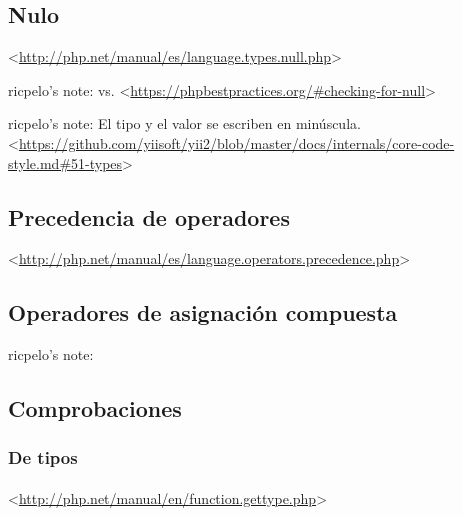 \documentclass[a4paper,11pt,spanish]{sphinxmanual}
\begin{document}
\subsection{Nulo}
\label{\detokenize{php:nulo}}
\textless{}\url{http://php.net/manual/es/language.types.null.php}\textgreater{}

\begin{DUlineblock}{0em}
\item[] ricpelo's note:  vs.
 \textless{}\url{https://phpbestpractices.org/\#checking-for-null}\textgreater{}
\item[] ricpelo's note: El tipo  y el valor  se escriben en
minúscula. \textless{}\url{https://github.com/yiisoft/yii2/blob/master/docs/internals/core-code-style.md\#51-types}\textgreater{}
\end{DUlineblock}


\subsection{Precedencia de operadores}
\label{\detokenize{php:precedencia-de-operadores}}
\textless{}\url{http://php.net/manual/es/language.operators.precedence.php}\textgreater{}


\subsection{Operadores de asignación compuesta}
\label{\detokenize{php:operadores-de-asignacion-compuesta}}
ricpelo's note: 


\subsection{Comprobaciones}
\label{\detokenize{php:comprobaciones}}

\subsubsection{De tipos}
\label{\detokenize{php:de-tipos}}

\paragraph{}
\label{\detokenize{php:gettype}}
\textless{}\url{http://php.net/manual/en/function.gettype.php}\textgreater{}
\end{document}
